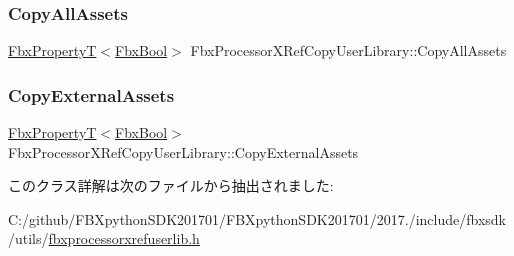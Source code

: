 \subsubsection{\texorpdfstring{Copy\+All\+Assets}{CopyAllAssets}}
{\footnotesize\ttfamily \hyperlink{class_fbx_property_t}{Fbx\+PropertyT}$<$\hyperlink{fbxtypes_8h_a92e0562b2fe33e76a242f498b362262e}{Fbx\+Bool}$>$ Fbx\+Processor\+X\+Ref\+Copy\+User\+Library\+::\+Copy\+All\+Assets}

\mbox{\label{class_fbx_processor_x_ref_copy_user_library_a06e90ca77b70e7241dd57981c30c5836}} 
\subsubsection{\texorpdfstring{Copy\+External\+Assets}{CopyExternalAssets}}
{\footnotesize\ttfamily \hyperlink{class_fbx_property_t}{Fbx\+PropertyT}$<$\hyperlink{fbxtypes_8h_a92e0562b2fe33e76a242f498b362262e}{Fbx\+Bool}$>$ Fbx\+Processor\+X\+Ref\+Copy\+User\+Library\+::\+Copy\+External\+Assets}



このクラス詳解は次のファイルから抽出されました\+:\begin{DoxyCompactItemize}
\item 
C\+:/github/\+F\+B\+Xpython\+S\+D\+K201701/\+F\+B\+Xpython\+S\+D\+K201701/2017./include/fbxsdk/utils/\hyperlink{fbxprocessorxrefuserlib_8h}{fbxprocessorxrefuserlib.\+h}\end{DoxyCompactItemize}
